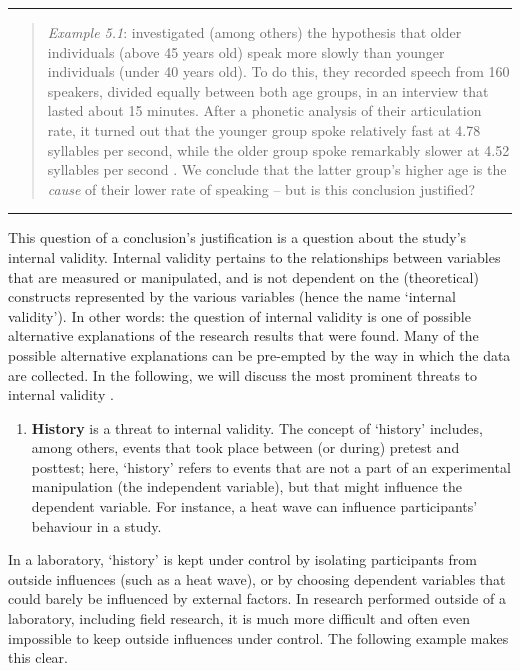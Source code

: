 \documentclass[
]{book}
\providecommand{\tightlist}{%
  \setlength{\itemsep}{0pt}\setlength{\parskip}{0pt}}
\begin{document}
\begin{center}\rule{0.5\linewidth}{0.5pt}\end{center}

\begin{quote}
\emph{Example 5.1}: \citet{Verh04} investigated (among others) the hypothesis that older individuals (above 45 years old) speak more slowly than younger individuals (under 40 years old). To do this, they recorded speech from 160 speakers, divided equally between both age groups, in an interview that lasted about 15 minutes. After a phonetic analysis of their articulation rate, it turned out that the younger group spoke relatively fast at 4.78 syllables per second, while the older group spoke remarkably slower at 4.52 syllables per second \citep[p.302]{Verh04}. We conclude that the latter group's higher age is the \emph{cause} of their lower rate of speaking -- but is this conclusion justified?
\end{quote}

\begin{center}\rule{0.5\linewidth}{0.5pt}\end{center}

This question of a conclusion's justification is a question about the study's internal validity. Internal validity pertains to the relationships between variables that are measured or manipulated, and is not dependent on the (theoretical) constructs represented by the various variables (hence the name `internal validity'). In other words: the question of internal validity is one of possible alternative explanations of the research results that were found. Many of the possible alternative explanations can be pre-empted by the way in which the data are collected. In the following, we will discuss the most prominent threats to internal validity \citep{SCC02}.

\begin{enumerate}
\def\labelenumi{\arabic{enumi}.}
\tightlist
\item
  \textbf{History} is a threat to internal validity. The concept of `history' includes, among others, events that took place between (or during) pretest and posttest; here, `history' refers to events that are not a part of an experimental manipulation (the independent variable), but that might influence the dependent variable. For instance, a heat wave can influence participants' behaviour in a study.
\end{enumerate}

In a laboratory, `history' is kept under control by isolating participants from outside influences (such as a heat wave), or by choosing dependent variables that could barely be influenced by external factors. In research performed outside of a laboratory, including field research, it is much more difficult and often even impossible to keep outside influences under control. The following example makes this clear.
\end{document}
